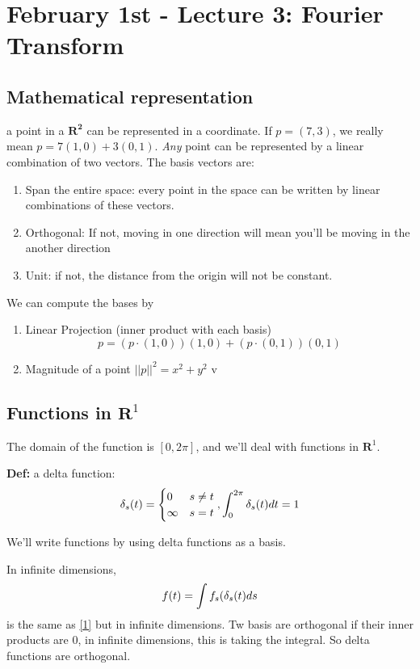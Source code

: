 \pagebreak
\section{February 1st - Lecture 3: Fourier Transform}
\label{sec:lec3}

\subsection{Mathematical representation}

\label{sec:math-repr}
a point in a $\mathbf{R^2}$ can be represented in a
coordinate. If $p=(7,3)$, we really mean $p = 7(1,0) +
3(0,1)$. \emph{Any} point can be represented by a linear combination
of two vectors. The basis vectors are:
\begin{enumerate}
\item Span the entire space: every point in the space can be written by  linear combinations of these vectors.
\item Orthogonal: If not, moving in one direction will mean you'll be
  moving in the another direction 
\item Unit: if not, the distance from the origin will not be constant.
\end{enumerate}

We can compute the bases by
\begin{enumerate}
\item Linear Projection (inner product with each basis) 
  \begin{equation}
p = (p\cdot
  (1,0))(1,0) + (p\cdot (0,1))(0,1)\label{eq:1}  
\end{equation}
\item Magnitude of a point $||p||^2 = x^2 + y^2$
v\end{enumerate}

\subsection{Functions in $\mathbf{R}^1$}
The domain of the function is $[0,2\pi]$, and we'll deal with
functions in $\mathbf{R}^1$.

\textbf{Def:} a delta function: $$\delta_s(t) =
\begin{cases}
  0 & s\neq t\\
\infty & s=t
\end{cases}, \int_0^{2\pi}\delta_s(t) dt = 1$$

We'll write functions by using delta functions as a basis.

In infinite dimensions, 
$$f(t) = \int f_s(\delta_s(t)ds$$ is the same as \eqref{1} but in
infinite dimensions. 
Tw basis are orthogonal if their inner products are 0, in infinite
dimensions, this is taking the integral. So delta functions are orthogonal.

